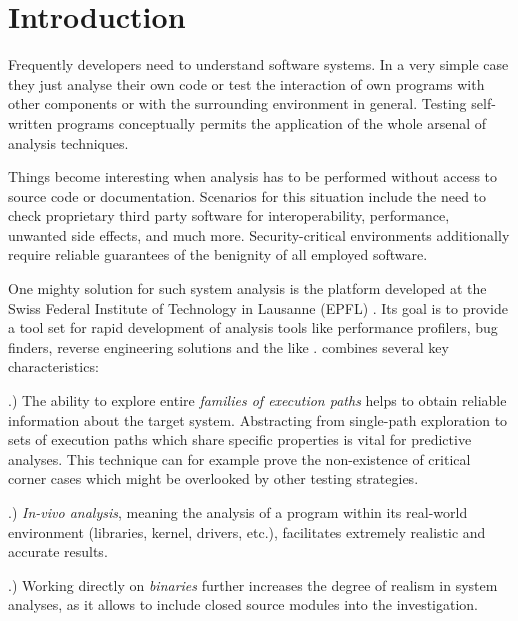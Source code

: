 \bigskip

\section{Introduction}


Frequently developers need to understand software systems.
In a very simple case they just analyse their own code or test the interaction of own programs with other components or with the surrounding environment in general.
Testing self-written programs conceptually permits the application of the whole arsenal of analysis techniques.


Things become interesting when analysis has to be performed without access to source code or documentation.
Scenarios for this situation include the need to check proprietary third party software for interoperability, performance, unwanted side effects, and much more.
Security-critical environments additionally require reliable guarantees of the benignity of all employed software.


One mighty solution for such system analysis is the \sse platform developed at the Swiss Federal Institute of Technology in Lausanne (EPFL) \cite{chip11s2e}.
Its goal is to provide a tool set for rapid development of analysis tools like performance profilers, bug finders, reverse engineering solutions and the like \cite{chip12s2e}.
\sse combines several key characteristics:

.) The ability to explore entire \textit{families of execution paths} helps to obtain reliable information about the target system.
Abstracting from single-path exploration to sets of execution paths which share specific properties is vital for predictive analyses.
This technique can for example prove the non-existence of critical corner cases which might be overlooked by other testing strategies.

.) \textit{In-vivo analysis}, meaning the analysis of a program within its real-world environment (libraries, kernel, drivers, etc.), facilitates extremely realistic and accurate results.

.) Working directly on \textit{binaries} further increases the degree of realism in system analyses, as it allows to include closed source modules into the investigation.

